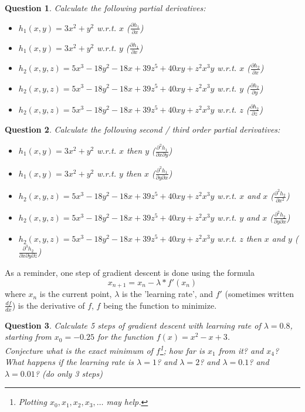 \documentclass[a4paper]{article}
\newtheorem{question}{Question}
\begin{document}
	\begin{question}
		Calculate the following partial derivatives:\\
		\begin{itemize}
			\item $h_1(x,y) = 3x^2+y^2$ w.r.t. $x$ ($\frac{\partial h_1}{\partial x}$)
			\item $h_1(x,y) = 3x^2+y^2$ w.r.t. $y$ ($\frac{\partial h_1}{\partial x}$)
			\item $h_2(x,y,z) = 5x^3-18y^2-18x+39z^5+40xy+z^2x^3y$ w.r.t. $x$ ($\frac{\partial h_2}{\partial x}$)
			\item $h_2(x,y,z) = 5x^3-18y^2-18x+39z^5+40xy+z^2x^3y$ w.r.t. $y$ ($\frac{\partial h_2}{\partial y}$)
			\item $h_2(x,y,z) = 5x^3-18y^2-18x+39z^5+40xy+z^2x^3y$ w.r.t. $z$ ($\frac{\partial h_2}{\partial z}$)
		\end{itemize}
	\end{question}
	
	\begin{question}
		Calculate the following second / third order partial derivatives:\\
		\begin{itemize}
			\item $h_1(x,y) = 3x^2+y^2$ w.r.t. $x$ then $y$ ($\frac{\partial^2 h_1}{\partial x \partial y}$)
			\item $h_1(x,y) = 3x^2+y^2$ w.r.t. $y$ then $x$ ($\frac{\partial^2 h_1}{\partial y \partial x}$)
			\item $h_2(x,y,z) = 5x^3-18y^2-18x+39z^5+40xy+z^2x^3y$ w.r.t. $x$ and $x$ ($\frac{\partial^2 h_2}{\partial x^2}$)
			\item $h_2(x,y,z) = 5x^3-18y^2-18x+39z^5+40xy+z^2x^3y$ w.r.t. $y$ and $x$ ($\frac{\partial^2 h_2}{\partial y \partial x}$)
			\item $h_2(x,y,z) = 5x^3-18y^2-18x+39z^5+40xy+z^2x^3y$ w.r.t. $z$ then $x$ and $y$ ($\frac{\partial^3 h_2}{\partial x \partial y \partial z}$)
		\end{itemize}
	\end{question}
	
	\vspace{3cm}
	
	As a reminder, one step of gradient descent is done using the formula $$x_{n+1} = x_n -\lambda * f'(x_n)$$
	where $x_n$ is the current point, $\lambda$ is the 'learning rate', and $f'$ (sometimes written $\frac{df}{dx}$) is the derivative of $f$, $f$ being the function to minimize.
	\begin{question}
		Calculate 5 steps of gradient descent with learning rate of $\lambda = 0.8$, starting from $x_0 = -0.25$ for the function $f(x) = x^2-x+3$.\\
		Conjecture what is the exact minimum of $f$\footnote{Plotting $x_0, x_1, x_2, x_3, \dots$ may help.}; how far is $x_1$ from it? and $x_4$?\\
		What happens if the learning rate is $\lambda = 1$? and $\lambda = 2$? and $\lambda = 0.1$? and $\lambda = 0.01$? (do only 3 steps)
	\end{question}
	
	
\end{document}
